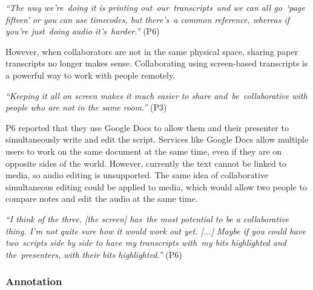 \textit{``The way we're doing it is printing out our transcripts and we can all go `page fifteen' or you can
use timecodes, but there's a common reference, whereas if you're just doing audio it's harder.''} (P6)

However, when collaborators are not in the same physical space, sharing paper transcripts no longer makes sense.
Collaborating using screen-based transcripts is a powerful way to work with people remotely.

\textit{``Keeping it all on screen makes it much easier to share and be collaborative with people who are not in the
same room.''} (P3)

P6 reported that they use Google Docs to allow them and their presenter to simultaneously write and edit the script.
Services like Google Docs allow multiple users to work on the same document at the same time, even if they are on
opposite sides of the world.  However, currently the text cannot be linked to media, so audio editing is unsupported.
The same idea of collaborative simultaneous editing could be applied to media, which would allow two people to compare
notes and edit the audio at the same time.

\textit{``I think of the three, [the screen] has the most potential to be a collaborative thing. I'm not quite sure how
  it would work out yet. [...]
  Maybe if you could have two scripts side by side to have my transcripts with my bits highlighted and the presenters,
with their bits highlighted.''} (P6)





\subsubsection{Annotation}

